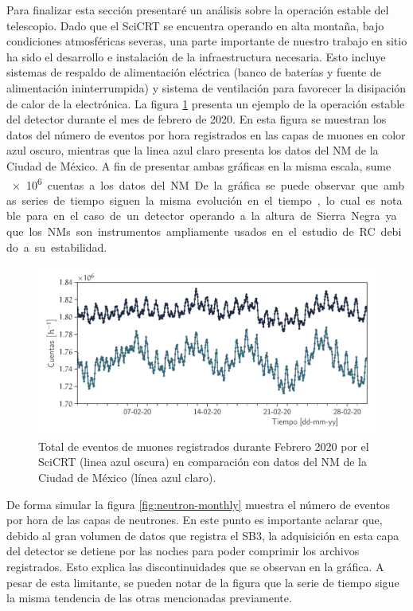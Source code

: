 Para finalizar esta sección presentaré un análisis sobre la operación estable del telescopio. Dado que el SciCRT se encuentra operando en alta montaña, bajo condiciones atmosféricas severas, una parte importante de nuestro trabajo en sitio ha sido el desarrollo e instalación de la infraestructura necesaria. Esto incluye sistemas de respaldo de alimentación eléctrica (banco de baterías y fuente de alimentación ininterrumpida) y sistema de ventilación para favorecer la disipación de calor de la electrónica. La figura \ref{fig:muon-monthly} presenta un ejemplo de la operación estable del detector durante el mes de febrero de \num{2020}. En esta figura se muestran los datos del número de eventos por hora registrados en las capas de muones en color azul oscuro, mientras que la linea azul claro presenta los datos del NM de la Ciudad de México. A fin de presentar ambas gráficas en la misma escala, sume \SI{e6} cuentas a los datos del NM. De la gráfica se puede observar que ambas series de tiempo siguen la misma evolución en el tiempo, lo cual es notable para en el caso de un detector operando a la altura de Sierra Negra ya que los NMs son instrumentos ampliamente usados en el estudio de RC debido a su estabilidad.

\begin{figure}
        \centering
        \includegraphics[width=\textwidth]{muon-monthly.pdf}
        \caption{Total de eventos de muones registrados durante Febrero \num{2020} por el SciCRT (linea azul oscura) en comparación con datos del NM de la Ciudad de México (línea azul claro).}
        \label{fig:muon-monthly}
\end{figure}

De forma simular la figura \ref{fig:neutron-monthly} muestra el número de eventos por hora de las capas de neutrones. En este punto es importante aclarar que, debido al gran volumen de datos que registra el SB3, la adquisición en esta capa del detector se detiene por las noches para poder comprimir los archivos registrados. Esto explica las discontinuidades que se observan en la gráfica. A pesar de esta limitante, se pueden notar de la figura que la serie de tiempo sigue la misma tendencia de las otras mencionadas previamente.

